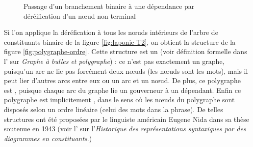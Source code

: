 \begin{figure}


\caption{\label{fig:dereification}Passage d’un branchement binaire à une dépendance par déréification d’un nœud non terminal}
\end{figure}
\todo[inline]{\Rightleftarrow}

Si l’on applique la déréfication à tous les nœuds intérieurs de l’arbre de constituants binaire de la figure \ref{fig:laponie-T2}, on obtient la structure de la figure \ref{fig:polygraphe-ordre}. Cette structure est un  (voir définition formelle dans l’ sur \textit{Graphe à bulles et polygraphe}) : ce n’est pas exactement un graphe, puisqu’un arc ne lie pas forcément deux nœuds (les nœuds sont les mots), mais il peut lier d’autres arcs entre eux ou un arc et un nœud. De plus, ce polygraphe est , puisque chaque arc du graphe lie un gouverneur à un dépendant. Enfin ce polygraphe est implicitement , dans le sens où les nœuds du polygraphe sont disposés selon un ordre linéaire (celui des mots dans la phrase). De telles structures ont été proposées par le linguiste américain Eugene Nida dans sa thèse soutenue en 1943 (voir l’ sur l’\textit{Historique des représentations syntaxiques par des diagrammes en constituants}.)


